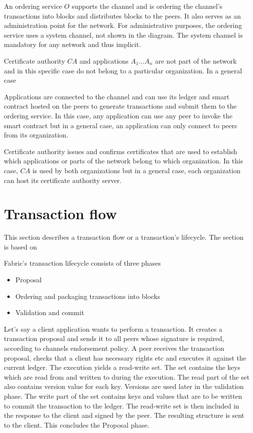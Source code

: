 An ordering service $O$ supports the channel and is ordering the channel's transactions into blocks and distributes blocks to the peers. It also serves as an administration point for the network. For administrative purposes, the ordering service uses a system channel, not shown in the diagram. The system channel is mandatory for any network and thus implicit.

Certificate authority $CA$ and applications $A_{1} ... A_{n}$ are not part of the network and in this specific case do not belong to a particular organization. In a general case

Applications are connected to the channel and can use its ledger and smart contract hosted on the peers to generate transactions and submit them to the ordering service. In this case, any application can use any peer to invoke the smart contract but in a general case, an application can only connect to peers from its organization.

Certificate authority issues and confirms certificates that are used to establish which applications or parts of the network belong to which organization. In this case, $CA$ is used by both organizations but in a general case, each organization can host its certificate authority server.

\newpage

\section{Transaction flow}
\label{sec:flow}
This section describes a transaction flow or a transaction's lifecycle. The section is based on \cite{fabricdocs:flow, fabricdocs:peer, fabricdocs:orderer}

Fabric's transaction lifecycle consists of three phases
\begin{itemize}
  \item Proposal
  \item Ordering and packaging transactions into blocks
  \item Validation and commit
\end{itemize}

Let's say a client application wants to perform a transaction. It creates a transaction proposal and sends it to all peers whose signature is required, according to channels endorsement policy.
A peer receives the transaction proposal, checks that a client has necessary rights etc and executes it against the current ledger. The execution yields a read-write set. The set contains the keys which are read from and written to during the execution. The read part of the set also contains version value for each key. Versions are used later in the validation phase. The write part of the set contains keys and values that are to be written to commit the transaction to the ledger. The read-write set is then included in the response to the client and signed by the peer. The resulting structure is sent to the client. This concludes the Proposal phase.

